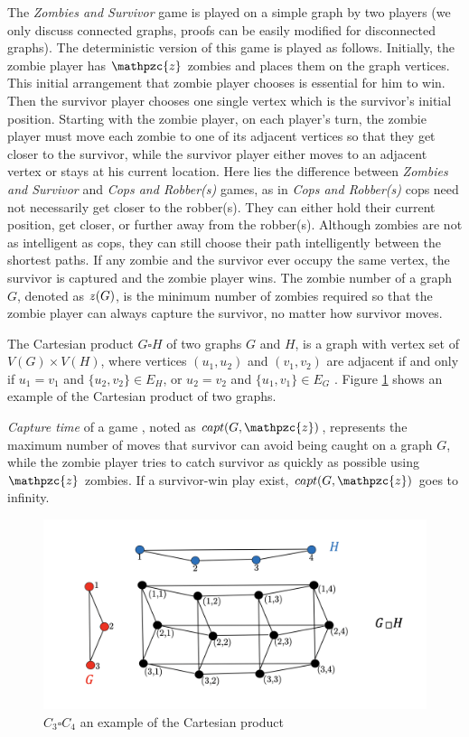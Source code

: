 \documentclass[1p]{elsarticle}
\newcommand{\zn}{\ooalign{$z$\cr\hfil\rule[.5ex]{.2em}{.08ex}\hfil\cr}}
\begin{document}
The {\it Zombies and Survivor} game is played on a simple graph by two players (we only discuss connected graphs, proofs
can be easily modified for disconnected graphs). The deterministic version of this game \cite{Fitz16} is played as
follows. Initially, the zombie player has $\mathpzc{z}$ zombies and places them on the graph vertices. This initial
arrangement that zombie player chooses is essential for him to win.  Then the survivor player chooses one single vertex
which is the survivor's initial position. Starting with the zombie player, on each player's turn, the zombie player must
move each zombie to one of its adjacent vertices so that they get closer to the survivor, while the survivor player
either moves to an adjacent vertex or stays at his current location. Here lies the difference between {\it Zombies and
Survivor} and {\it Cops and Robber(s)} games, as in {\it Cops and Robber(s)} cops need not necessarily get closer to the
robber(s). They can either hold their current position, get closer, or further away from the robber(s). Although zombies
are not as intelligent as cops, they can still choose their path intelligently between the shortest paths. If any zombie
and the survivor ever occupy the same vertex, the survivor is captured and the zombie player wins. The zombie number of
a graph $G$, denoted as $\zn(G)$, is the minimum number of zombies required so that the zombie player can always capture
the survivor, no matter how survivor moves.

The Cartesian product $G \square H$ of two graphs $G$ and $H$, is a graph with vertex set of $V(G) \times V(H)$, where
vertices $(u_1 , u_2)$ and $(v_1 , v_2)$ are adjacent if and only if $u_1 = v_1$ and $ \{ u_2 , v_2 \} \in E_{H} $, or
$u_2 = v_2$ and $ \{u_1 , v_1 \} \in E_{G}$ \cite{West02}. Figure \ref{fig:p2} shows an example of the Cartesian product
of two graphs.

{\it Capture time} of a game \cite{Bonato09}, noted as $capt(G,\mathpzc{z})$, represents the maximum number of moves
that survivor can avoid being caught on a graph $G$, while the zombie player tries to catch survivor as quickly as
possible using $\mathpzc{z}$ zombies. If a survivor-win play exist, $capt(G,\mathpzc{z})$ goes to infinity.

\begin{figure}[h!]
	\centering
	\includegraphics[width=0.9\linewidth]{fig/CpWest.png}
	\caption{$C_3 \square C_4$ an example of the Cartesian product}
	\label{fig:p2}
\end{figure}
\end{document}
